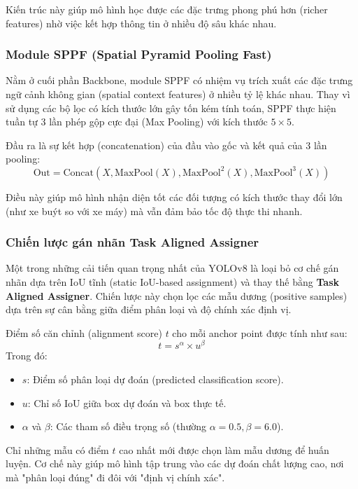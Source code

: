 Kiến trúc này giúp mô hình học được các đặc trưng phong phú hơn (richer features) nhờ việc kết hợp thông tin ở nhiều độ sâu khác nhau.

\subsubsection{Module SPPF (Spatial Pyramid Pooling Fast)}
Nằm ở cuối phần Backbone, module SPPF có nhiệm vụ trích xuất các đặc trưng ngữ cảnh không gian (spatial context features) ở nhiều tỷ lệ khác nhau. Thay vì sử dụng các bộ lọc có kích thước lớn gây tốn kém tính toán, SPPF thực hiện tuần tự 3 lần phép gộp cực đại (Max Pooling) với kích thước $5 \times 5$.

Đầu ra là sự kết hợp (concatenation) của đầu vào gốc và kết quả của 3 lần pooling:
\begin{equation}
    \text{Out} = \text{Concat}(X, \text{MaxPool}(X), \text{MaxPool}^2(X), \text{MaxPool}^3(X))
\end{equation}

Điều này giúp mô hình nhận diện tốt các đối tượng có kích thước thay đổi lớn (như xe buýt so với xe máy) mà vẫn đảm bảo tốc độ thực thi nhanh.

\subsubsection{Chiến lược gán nhãn Task Aligned Assigner}
Một trong những cải tiến quan trọng nhất của YOLOv8 là loại bỏ cơ chế gán nhãn dựa trên IoU tĩnh (static IoU-based assignment) và thay thế bằng \textbf{Task Aligned Assigner}. Chiến lược này chọn lọc các mẫu dương (positive samples) dựa trên sự cân bằng giữa điểm phân loại và độ chính xác định vị.

Điểm số căn chỉnh (alignment score) $t$ cho mỗi anchor point được tính như sau:
\begin{equation}
    t = s^\alpha \times u^\beta
\end{equation}
Trong đó:
\begin{itemize}
    \item $s$: Điểm số phân loại dự đoán (predicted classification score).
    \item $u$: Chỉ số IoU giữa box dự đoán và box thực tế.
    \item $\alpha$ và $\beta$: Các tham số điều trọng số (thường $\alpha=0.5, \beta=6.0$).
\end{itemize}

Chỉ những mẫu có điểm $t$ cao nhất mới được chọn làm mẫu dương để huấn luyện. Cơ chế này giúp mô hình tập trung vào các dự đoán chất lượng cao, nơi mà "phân loại đúng" đi đôi với "định vị chính xác".

